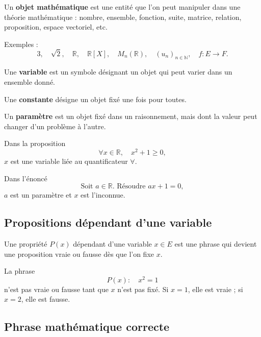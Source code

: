 \documentclass[11pt,a4paper]{article}
\newcommand{\N}{\mathbb{N}}
\newcommand{\R}{\mathbb{R}}
\begin{document}
\begin{definitionbox}
Un \textbf{objet mathématique} est une entité que l'on peut manipuler dans une théorie mathématique : nombre, ensemble, fonction, suite, matrice, relation, proposition, espace vectoriel, etc.

Exemples :
\[
3,\quad \sqrt2,\quad \R,\quad \R[X],\quad M_n(\R),\quad (u_n)_{n\in\N},\quad f:E\to F.
\]
\end{definitionbox}

\begin{definitionbox}
Une \textbf{variable} est un symbole désignant un objet qui peut varier dans un ensemble donné.

Une \textbf{constante} désigne un objet fixé une fois pour toutes.

Un \textbf{paramètre} est un objet fixé dans un raisonnement, mais dont la valeur peut changer d'un problème à l'autre.
\end{definitionbox}

\begin{exemplebox}
Dans la proposition
\[
\forall x\in\R,\quad x^2+1\geq 0,
\]
\(x\) est une variable liée au quantificateur \(\forall\).

Dans l'énoncé
\[
\text{Soit } a\in\R. \text{ Résoudre } ax+1=0,
\]
\(a\) est un paramètre et \(x\) est l'inconnue.
\end{exemplebox}

\subsection{Propositions dépendant d'une variable}

\begin{definitionbox}
Une propriété \(P(x)\) dépendant d'une variable \(x\in E\) est une phrase qui devient une proposition vraie ou fausse dès que l'on fixe \(x\).
\end{definitionbox}

\begin{exemplebox}
La phrase
\[
P(x):\quad x^2=1
\]
n'est pas vraie ou fausse tant que \(x\) n'est pas fixé. Si \(x=1\), elle est vraie ; si \(x=2\), elle est fausse.
\end{exemplebox}

\subsection{Phrase mathématique correcte}
\end{document}
